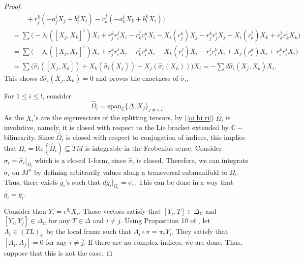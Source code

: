 \documentclass{article}
\theoremstyle{remark}
\begin{document}
\begin{proof}
\begin{align*}
        &\quad\quad+r^k_j(-a^i_jX_j+b^j_iX_i)-r^j_k(-a^i_kX_k+b^k_iX_i)\Big)\\
        &=\sum\Big(-\lambda_i([X_j,X_k]^v)X_i+r^k_jr^j_iX_i-r^j_kr^k_iX_i-X_i(r^k_j)X_j-r^k_jr^i_jX_j+X_i(r^j_k)X_k+r^j_kr^i_k X_k\Big)\\
        &=\sum\Big(-\lambda_i([X_j,X_k]^v)X_i+r^k_jr^j_iX_i-r^j_kr^k_iX_i-X_k(r^j_i)X_i-r^j_ir^k_iX_i+X_j(r^k_i)X_i+r^k_ir^j_i X_i\Big)\\
        &=\sum \Big(\hat{\sigma}_i([X_j,X_k])+X_k(\hat{\sigma}_i(X_j))-X_j(\hat{\sigma}_i(X_k))\Big)X_i=-\sum d\hat{\sigma}_i(X_j,X_k)X_i.
    \end{align*}
    This shows $d\hat{\sigma}_i(X_j,X_k)=0$ and proves the exactness of $\hat{\sigma}_i$.
    
    For $1\leq i\leq l$, consider 
    $$\hat{\Omega}_i=\text{span}_{\mathbb{C}}\{\Delta,X_j\}_{j\neq i, \overline{i}}.$$ 
    As the $X_i$'s are the eigenvectors of the splitting tensors, by (\ref{ai bi ri}) $\hat{\Omega}_i$ is involutive, namely, it is closed with respect to the Lie bracket extended by $\mathbb{C}-$bilinearity.
    Since $\hat{\Omega}_i$ is closed with respect to conjugation of indices, this implies that $\Omega_i=\text{Re}(\hat{\Omega}_i)\subseteq TM$ is integrable in the Frobenius sense. Consider $\sigma_i=\hat{\sigma}_i|_{\Omega_i}$ which is a closed 1-form, since $\hat{\sigma}_i$ is closed. 
    Therefore, we can integrate $\sigma_i$ on $M^n$ by defining arbitrarily values along a transversal submanifold to $\Omega_i$. Thus, there exists $g_i$'s such that $dg_i|_{\Omega_i}=\sigma_i$. 
    This can be done in a way that $\overline{g_i}=g_{\overline{i}}$. 
    
    Consider then $Y_i=e^{g_i}X_i$. Those vectors satisfy that $[Y_i,T]\in\Delta_{\mathbb{C}}$ and $[Y_i,Y_j]\in\Delta_\mathbb{C}$ for any $T\in\Delta$ and $i\neq \overline{j}$. 
    Using Proposition 10 of \cite{DFT}, let $A_i\in (TL)_\mathbb{C}$ be the local frame such that $A_i\circ\pi=\pi_{*}Y_i$. They satisfy that $[A_i,A_j]=0$ for any $i\neq \overline{j}$. If there are no complex indices, we are done. Thus, suppose that this is not the case.
    

\end{proof}
\end{document}
